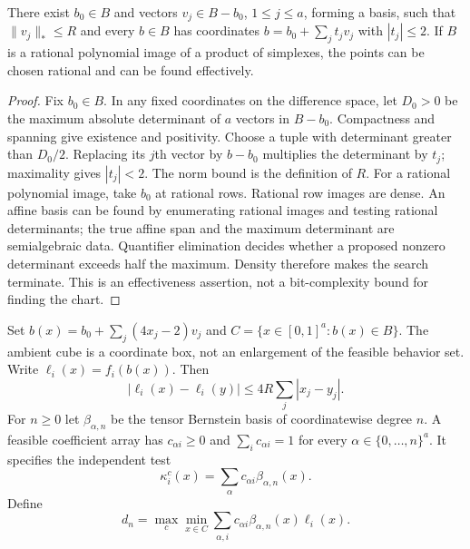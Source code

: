 \begin{lemma}
\label{lem:v17-chart}
There exist $b_0\in B$ and vectors $v_j\in B-b_0$, $1\le j\le a$,
forming a basis, such that $\|v_j\|_*\le R$ and every $b\in B$ has
coordinates $b=b_0+\sum_j t_jv_j$ with $|t_j|\le2$.
If $B$ is a rational polynomial image of a product of simplexes, the
points can be chosen rational and can be found effectively.
\end{lemma}
\begin{proof}
Fix $b_0\in B$. In any fixed coordinates on the difference space,
let $D_0>0$ be the maximum absolute determinant of $a$ vectors in
$B-b_0$. Compactness and spanning give existence and positivity.
Choose a tuple with determinant greater than $D_0/2$. Replacing its
$j$th vector by $b-b_0$ multiplies the determinant by $t_j$; maximality
gives $|t_j|<2$. The norm bound is the definition of $R$.
For a rational polynomial image, take $b_0$ at rational rows. Rational
row images are dense. An affine basis can be found by enumerating
rational images and testing rational determinants; the true affine
span and the maximum determinant are semialgebraic data. Quantifier
elimination decides whether a proposed nonzero determinant exceeds
half the maximum. Density therefore makes the search terminate. This
is an effectiveness assertion, not a bit-complexity bound for finding
the chart.
\end{proof}

Set $b(x)=b_0+\sum_j(4x_j-2)v_j$ and
$C=\{x\in[0,1]^a:b(x)\in B\}$. The ambient cube is a coordinate
box, not an enlargement of the feasible behavior set. Write
$\ell_i(x)=f_i(b(x))$. Then
\begin{equation}\label{eq:v17-lipschitz}
 |\ell_i(x)-\ell_i(y)|\le4R\sum_j|x_j-y_j|.
\end{equation}
For $n\ge0$ let $\beta_{\alpha,n}$ be the tensor Bernstein basis of
coordinatewise degree $n$. A feasible coefficient array has
$c_{\alpha i}\ge0$ and $\sum_i c_{\alpha i}=1$ for every
$\alpha\in\{0,\ldots,n\}^a$. It specifies the independent test
\[
 \kappa_i^c(x)=\sum_\alpha c_{\alpha i}\beta_{\alpha,n}(x).
\]
Define
\begin{equation}\label{eq:v17-hierarchy}
 d_n=\max_c\min_{x\in C}
       \sum_{\alpha,i}c_{\alpha i}\beta_{\alpha,n}(x)\ell_i(x).
\end{equation}

